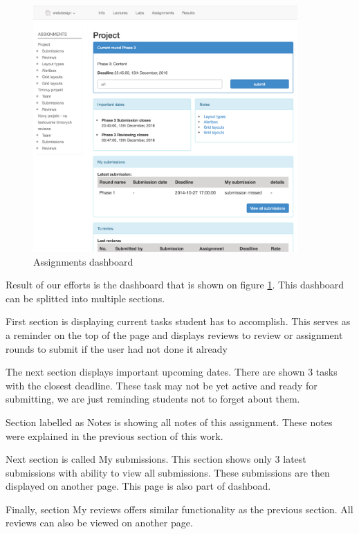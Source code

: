 \begin{figure}[h]
    \centering
    \includegraphics[width=0.9\textwidth]{images/dashboard.png}
    \caption{Assignments dashboard}
    \label{fig:assignments_dashboard}
\end{figure}

Result of our efforts is the dashboard that is shown on figure \ref{fig:assignments_dashboard}. This dashboard can be splitted into multiple sections.

First section is displaying current tasks student has to accomplish. This serves as a reminder on the top of the page and displays reviews to review or assignment rounds to submit if the user had not done it already

The next section displays important upcoming dates. There are shown 3 tasks with the closest deadline. These task may not be yet active and ready for submitting, we are just reminding students not to forget about them. 

Section labelled as Notes is showing all notes of this assignment. These notes were explained in the previous section of this work.

Next section is called My submissions. This section shows only 3 latest submissions with ability to view all submissions. These submissions are then displayed on another page. This page is also part of dashboad.

Finally, section My reviews offers similar functionality as the previous section. All reviews can also be viewed on another page.


